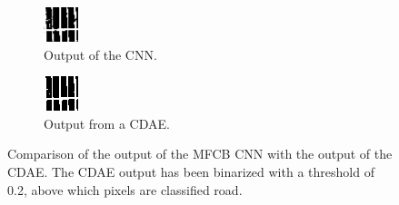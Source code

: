 \documentclass[10pt,conference,compsocconf]{IEEEtran}
\begin{document}
\begin{figure}[h!]
\begin{subfigure}{0.2\textwidth}
\includegraphics[width=\linewidth]{cnn_41.png}
\caption{Output of the CNN.}
\label{fig:DAE1}
\end{subfigure}
\hspace*{\fill}
\begin{subfigure}{0.2\textwidth}
\includegraphics[width=\linewidth]{cae_41.png}
\caption{Output from a CDAE.}
\label{fig:DAE2}
\end{subfigure}

\caption{Comparison of the output of the MFCB CNN with the output of the CDAE. The CDAE output has been binarized with a threshold of 0.2, above which pixels are classified road.}
\label{fig:CDAE}
\end{figure}
\end{document}
